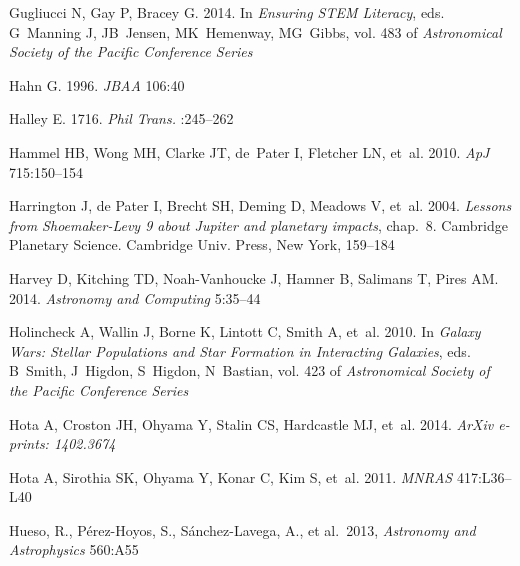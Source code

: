 \documentclass{ar2e}
\def\mnras{MNRAS}
\begin{document}
\begin{thebibliography}{}
{Gugliucci} N, {Gay} P, {Bracey} G. 2014.
\newblock In \textit{Ensuring STEM Literacy}, eds. G~{Manning} J, JB~{Jensen},
  MK~{Hemenway}, MG~{Gibbs}, vol. 483 of \textit{Astronomical Society of the
  Pacific Conference Series}

{Hahn} G. 1996.
\newblock \textit{{JBAA}} 106:40

{Halley} E. 1716.
\newblock \textit{Phil Trans.} :245--262

Hammel HB, Wong MH, Clarke JT, de~Pater I, Fletcher LN, et~al. 2010.
\newblock \textit{ApJ} 715:150--154

{Harrington} J, {de Pater} I, {Brecht} SH, {Deming} D, {Meadows} V, et~al.
  2004.
\newblock \textit{{Lessons from Shoemaker-Levy 9 about Jupiter and planetary
  impacts}}, chap.~8.
\newblock Cambridge Planetary Science. Cambridge Univ. Press, New York,
  159--184

{Harvey} D, {Kitching} TD, {Noah-Vanhoucke} J, {Hamner} B, {Salimans} T,
  {Pires} AM. 2014.
\newblock \textit{Astronomy and Computing} 5:35--44

{Holincheck} A, {Wallin} J, {Borne} K, {Lintott} C, {Smith} A, et~al. 2010.
\newblock In \textit{Galaxy Wars: Stellar Populations and Star Formation in
  Interacting Galaxies}, eds. B~{Smith}, J~{Higdon}, S~{Higdon}, N~{Bastian},
  vol. 423 of \textit{Astronomical Society of the Pacific Conference Series}

{Hota} A, {Croston} JH, {Ohyama} Y, {Stalin} CS, {Hardcastle} MJ, et~al. 2014.
\newblock \textit{ArXiv e-prints: 1402.3674}

{Hota} A, {Sirothia} SK, {Ohyama} Y, {Konar} C, {Kim} S, et~al. 2011.
\newblock \textit{\mnras} 417:L36--L40

 Hueso, R., P{\'e}rez-Hoyos, S., S{\'a}nchez-Lavega, A., et al.\ 2013, 
\newblock \textit{Astronomy and Astrophysics} 560:A55


\end{thebibliography}
\end{document}
